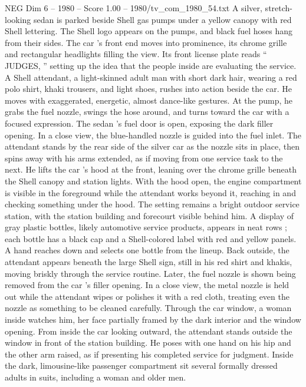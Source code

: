 \begin{textsample}{NEG Dim 6 – 1980 – Score 1.00 – 1980/tv\_com\_1980\_54.txt}  \label{ex:f6_neg_067}
A silver, stretch-looking sedan is parked beside Shell gas pumps under a yellow canopy with red Shell lettering.
The Shell logo appears on the pumps, and black fuel hoses hang from their sides.
The car ’s front end moves into prominence, its chrome grille and rectangular headlights filling the view.
Its front license plate reads “ JUDGES, ” setting up the idea that the people inside are evaluating the service.
A Shell attendant, a light-skinned adult man with short dark hair, wearing a red polo shirt, khaki trousers, and light shoes, rushes into action beside the car.
He moves with exaggerated, energetic, almost dance-like gestures.
At the pump, he grabs the fuel nozzle, swings the hose around, and turns toward the car with a focused expression.
The sedan ’s fuel door is open, exposing the dark filler opening.
In a close view, the blue-handled nozzle is guided into the fuel inlet.
The attendant stands by the rear side of the silver car as the nozzle sits in place, then spins away with his arms extended, as if moving from one service task to the next.
He lifts the car ’s hood at the front, leaning over the chrome grille beneath the Shell canopy and station lights.
With the hood open, the engine compartment is visible in the foreground while the attendant works beyond it, reaching in and checking something under the hood.
The setting remains a bright outdoor service station, with the station building and forecourt visible behind him.
A display of gray plastic bottles, likely automotive service products, appears in neat rows ; each bottle has a black cap and a Shell-colored label with red and yellow panels.
A hand reaches down and selects one bottle from the lineup.
Back outside, the attendant appears beneath the large Shell sign, still in his red shirt and khakis, moving briskly through the service routine.
Later, the fuel nozzle is shown being removed from the car ’s filler opening.
In a close view, the metal nozzle is held out while the attendant wipes or polishes it with a red cloth, treating even the nozzle as something to be cleaned carefully.
Through the car window, a woman inside watches him, her face partially framed by the dark interior and the window opening.
From inside the car looking outward, the attendant stands outside the window in front of the station building.
He poses with one hand on his hip and the other arm raised, as if presenting his completed service for judgment.
Inside the dark, limousine-like passenger compartment sit several formally dressed adults in suits, including a woman and older men.

\end{textsample}
